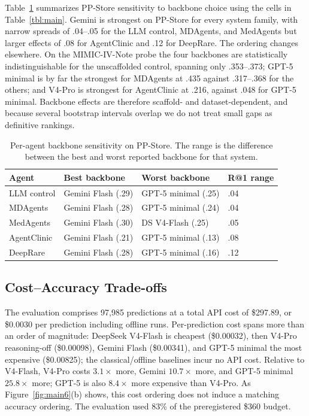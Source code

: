 Table~\ref{tbl:bbsens} summarizes PP-Store sensitivity to backbone choice using the cells in Table~\ref{tbl:main}. Gemini is strongest on PP-Store for every system family, with narrow spreads of .04--.05 for the LLM control, MDAgents, and MedAgents but larger effects of .08 for AgentClinic and .12 for DeepRare. The ordering changes elsewhere. On the MIMIC-IV-Note probe the four backbones are statistically indistinguishable for the unscaffolded control, spanning only .353--.373; GPT-5 minimal is by far the strongest for MDAgents at .435 against .317--.368 for the others; and V4-Pro is strongest for AgentClinic at .216, against .048 for GPT-5 minimal. Backbone effects are therefore scaffold- and dataset-dependent, and because several bootstrap intervals overlap we do not treat small gaps as definitive rankings.

\begin{table}[t]
\centering
\scriptsize
\setlength{\tabcolsep}{8pt}
\caption{Per-agent backbone sensitivity on PP-Store. The range is the difference between the best and worst reported backbone for that system.}
\label{tbl:bbsens}
\begin{tabular}{@{}llll@{}}
\toprule
Agent & Best backbone & Worst backbone & R@1 range \\
\midrule
LLM control & Gemini Flash (.29) & GPT-5 minimal (.25) & .04 \\
MDAgents & Gemini Flash (.28) & GPT-5 minimal (.24) & .04 \\
MedAgents & Gemini Flash (.30) & DS V4-Flash (.25) & .05 \\
AgentClinic & Gemini Flash (.21) & GPT-5 minimal (.13) & .08 \\
DeepRare & Gemini Flash (.28) & GPT-5 minimal (.16) & .12 \\
\bottomrule
\end{tabular}
\end{table}


\subsection{Cost--Accuracy Trade-offs}
\label{sec-6-3}

The evaluation comprises 97,985 predictions at a total API cost of \$297.89, or \$0.0030 per prediction including offline runs. Per-prediction cost spans more than an order of magnitude: DeepSeek V4-Flash is cheapest (\$0.00032), then V4-Pro reasoning-off (\$0.00098), Gemini Flash (\$0.00341), and GPT-5 minimal the most expensive (\$0.00825); the classical/offline baselines incur no API cost. Relative to V4-Flash, V4-Pro costs $3.1\times$ more, Gemini $10.7\times$ more, and GPT-5 minimal $25.8\times$ more; GPT-5 is also $8.4\times$ more expensive than V4-Pro. As Figure~\ref{fig:main6}(b) shows, this cost ordering does not induce a matching accuracy ordering. The evaluation used 83\% of the preregistered \$360 budget.

